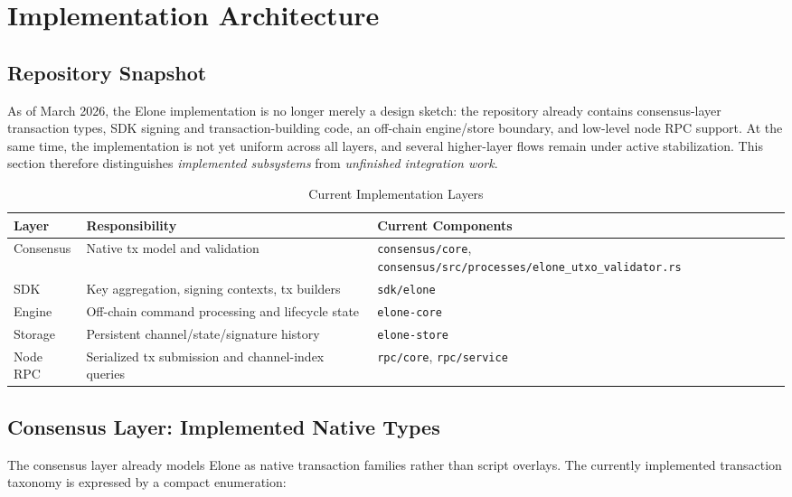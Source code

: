 \section{Implementation Architecture}

\subsection{Repository Snapshot}

As of March 2026, the Elone implementation is no longer merely a design sketch: the repository already contains consensus-layer transaction types, SDK signing and transaction-building code, an off-chain engine/store boundary, and low-level node RPC support. At the same time, the implementation is not yet uniform across all layers, and several higher-layer flows remain under active stabilization. This section therefore distinguishes \textit{implemented subsystems} from \textit{unfinished integration work}.

\begin{table}[htbp]
\centering
\caption{Current Implementation Layers}
\label{tab:impl_layers_current}
\small
\begin{tabularx}{\linewidth}{@{}l l X@{}}
\toprule
\textbf{Layer} & \textbf{Responsibility} & \textbf{Current Components} \\
\midrule
Consensus & Native tx model and validation & \texttt{consensus/core}, \texttt{consensus/src/processes/elone\_utxo\_validator.rs} \\
SDK & Key aggregation, signing contexts, tx builders & \texttt{sdk/elone} \\
Engine & Off-chain command processing and lifecycle state & \texttt{elone-core} \\
Storage & Persistent channel/state/signature history & \texttt{elone-store} \\
Node RPC & Serialized tx submission and channel-index queries & \texttt{rpc/core}, \texttt{rpc/service} \\
\bottomrule
\end{tabularx}
\end{table}

\subsection{Consensus Layer: Implemented Native Types}

The consensus layer already models Elone as native transaction families rather than script overlays. The currently implemented transaction taxonomy is expressed by a compact enumeration:

